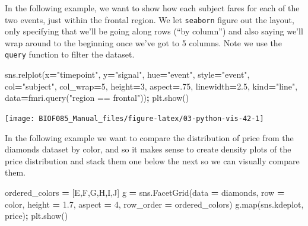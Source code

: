 \documentclass[
  letterpaper,
]{scrbook}
\newenvironment{Shaded}{\begin{snugshade}}{\end{snugshade}}
\newcommand{\BuiltInTok}[1]{#1}
\newcommand{\DecValTok}[1]{\textcolor[rgb]{0.00,0.00,0.81}{#1}}
\newcommand{\FloatTok}[1]{\textcolor[rgb]{0.00,0.00,0.81}{#1}}
\newcommand{\NormalTok}[1]{#1}
\newcommand{\OperatorTok}[1]{\textcolor[rgb]{0.81,0.36,0.00}{\textbf{#1}}}
\newcommand{\StringTok}[1]{\textcolor[rgb]{0.31,0.60,0.02}{#1}}
\begin{document}
In the following example, we want to show how each subject fares for each of the two events, just within the frontal region. We let \texttt{seaborn} figure out the layout, only specifying that we'll be going along rows (``by column'') and also saying we'll wrap around to the beginning once we've got to 5 columns. Note we use the \texttt{query} function to filter the dataset.

\begin{Shaded}
\begin{Highlighting}[]
\NormalTok{sns.relplot(x}\OperatorTok{=}\StringTok{"timepoint"}\NormalTok{, y}\OperatorTok{=}\StringTok{"signal"}\NormalTok{, hue}\OperatorTok{=}\StringTok{"event"}\NormalTok{, style}\OperatorTok{=}\StringTok{"event"}\NormalTok{,}
\NormalTok{            col}\OperatorTok{=}\StringTok{"subject"}\NormalTok{, col\_wrap}\OperatorTok{=}\DecValTok{5}\NormalTok{,}
\NormalTok{            height}\OperatorTok{=}\DecValTok{3}\NormalTok{, aspect}\OperatorTok{=}\FloatTok{.75}\NormalTok{, linewidth}\OperatorTok{=}\FloatTok{2.5}\NormalTok{,}
\NormalTok{            kind}\OperatorTok{=}\StringTok{"line"}\NormalTok{, data}\OperatorTok{=}\NormalTok{fmri.query(}\StringTok{"region == \textquotesingle{}frontal\textquotesingle{}"}\NormalTok{))}\OperatorTok{;}
\NormalTok{plt.show()}
\end{Highlighting}
\end{Shaded}

\begin{center}\texttt{[image: BIOF085\_Manual\_files/figure-latex/03-python-vis-42-1]} \end{center}

In the following example we want to compare the distribution of price from the diamonds dataset by color, and so it makes sense to create density plots of the price distribution and stack them one below the next so we can visually compare them.

\begin{Shaded}
\begin{Highlighting}[]
\NormalTok{ordered\_colors }\OperatorTok{=}\NormalTok{ [}\StringTok{\textquotesingle{}E\textquotesingle{}}\NormalTok{,}\StringTok{\textquotesingle{}F\textquotesingle{}}\NormalTok{,}\StringTok{\textquotesingle{}G\textquotesingle{}}\NormalTok{,}\StringTok{\textquotesingle{}H\textquotesingle{}}\NormalTok{,}\StringTok{\textquotesingle{}I\textquotesingle{}}\NormalTok{,}\StringTok{\textquotesingle{}J\textquotesingle{}}\NormalTok{]}
\NormalTok{g }\OperatorTok{=}\NormalTok{ sns.FacetGrid(data }\OperatorTok{=}\NormalTok{ diamonds, row }\OperatorTok{=} \StringTok{\textquotesingle{}color\textquotesingle{}}\NormalTok{, height }\OperatorTok{=} \FloatTok{1.7}\NormalTok{, }
\NormalTok{                  aspect }\OperatorTok{=} \DecValTok{4}\NormalTok{, row\_order }\OperatorTok{=}\NormalTok{ ordered\_colors)}
\NormalTok{g.}\BuiltInTok{map}\NormalTok{(sns.kdeplot, }\StringTok{\textquotesingle{}price\textquotesingle{}}\NormalTok{)}\OperatorTok{;}
\NormalTok{plt.show()}
\end{Highlighting}
\end{Shaded}
\end{document}
